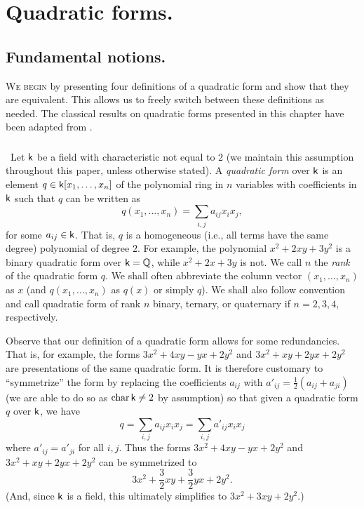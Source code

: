 \chapter{Quadratic forms.}
\label{chap:quadratic-forms}

\section{Fundamental notions.}

{\scshape We begin} by presenting four definitions of a quadratic form and show that they are equivalent. This allows us to freely switch between these definitions as needed. The classical results on quadratic forms presented in this chapter have been adapted from \cite{clarkquadratic,lam1973quadratic,ormsbynotes,szymiczek2017bilinear}.

\subsection{}\label{sec:quadratic-forms}~Let \(\mathsf{k}\) be a field with characteristic not equal to \(2\) (we maintain this assumption throughout this paper, unless otherwise stated). A \emph{quadratic form} over \(\mathsf{k}\) is an element \(q \in \mathsf{k}[x_1, \dots, x_n]\) of the polynomial ring in \(n\) variables with coefficients in \(\mathsf{k}\) such that \(q\) can be written as
\[
  q(x_1, \dots, x_n) = \sum_{i, j} a_{ij}x_ix_j,
\]
for some \(a_{ij} \in \mathsf{k}\). That is, \(q\) is a homogeneous (i.e., all terms have the same degree) polynomial of degree \(2\). For example, the polynomial \(x^2 + 2xy + 3y^2\) is a binary quadratic form over \(\mathsf{k} = \mathbb{Q}\), while \(x^2 + 2x + 3y\) is not. We call \(n\) the \emph{rank} of the quadratic form \(q\). We shall often abbreviate the column vector \((x_1, \dots, x_n)\) as \(x\) (and \(q(x_1, \dots, x_n)\) as \(q(x)\) or simply \(q\)). We shall also follow convention and call quadratic form of rank \(n\) binary, ternary, or quaternary if \(n = 2, 3, 4\), respectively.

Observe that our definition of a quadratic form allows for some redundancies. That is, for example, the forms \(3x^2 + 4xy - yx + 2y^2\) and \(3x^2 + xy + 2yx + 2y^2\) are presentations of the same quadratic form. It is therefore customary  to ``symmetrize'' the form \cite{lam1973quadratic} by replacing the coefficients \(a_{ij}\) with \(a'_{ij} = \frac{1}{2}(a_{ij} + a_{ji})\) (we are able to do so as \(\operatorname{char} \mathsf{k} \neq 2\) by assumption) so that given a quadratic form \(q\) over \(\mathsf{k}\), we have
\[
  q = \sum_{i, j} a_{ij} x_i x_j = \sum_{i, j} a'_{ij} x_i x_j
\]
where \(a'_{ij} = a'_{ji}\) for all \(i, j\). Thus the forms \(3x^2 + 4xy - yx + 2y^2\) and \(3x^2 + xy + 2yx + 2y^2\) can be symmetrized to \[3x^2 +\frac{3}{2}xy + \frac{3}{2}yx + 2y^2.\] (And, since \(\mathsf{k}\) is a field, this ultimately simplifies to \(3x^2 + 3xy + 2y^2\).)

